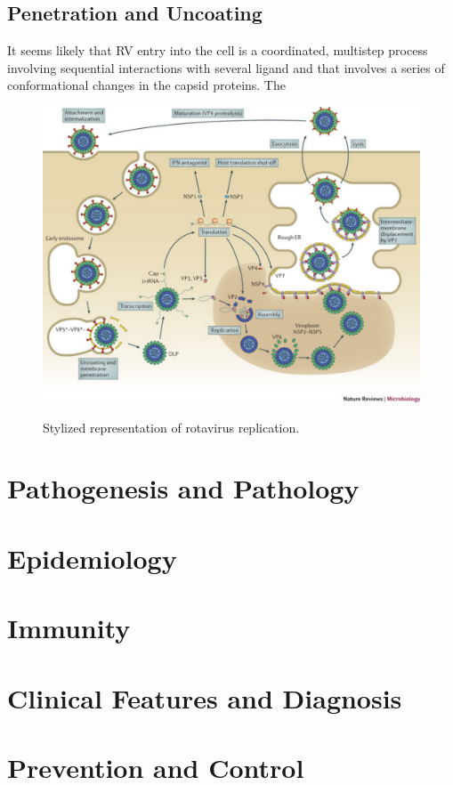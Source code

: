 \documentclass[11pt,final] {article}
\begin{document}
\subsection{Penetration and Uncoating}

It seems likely that RV entry into the cell is a coordinated, multistep process involving sequential interactions with several ligand and that involves a series of conformational changes in the capsid proteins. The

\begin{landscape}
\begin{figure}[htp]
\includegraphics{replication}\\
\caption{Stylized representation of rotavirus replication.}
\end{figure}
\end{landscape}

\section{Pathogenesis and Pathology}

\section{Epidemiology}

\section{Immunity}

\section{Clinical Features and Diagnosis}

\section{Prevention and Control}
\end{document}
